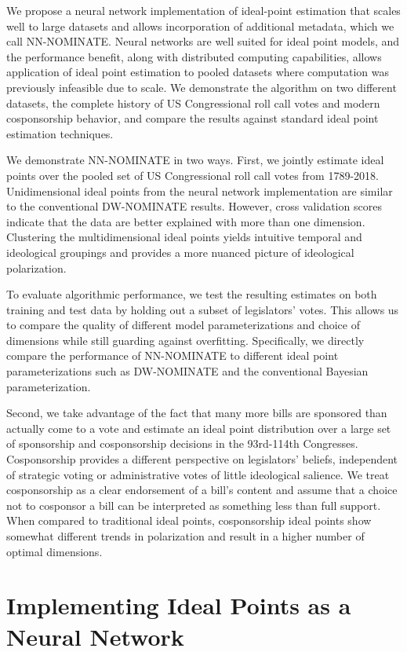 \documentclass[11pt,]{article}
\begin{document}
We propose a neural network implementation of ideal-point estimation
that scales well to large datasets and allows incorporation of
additional metadata, which we call NN-NOMINATE. Neural networks are well
suited for ideal point models, and the performance benefit, along with
distributed computing capabilities, allows application of ideal point
estimation to pooled datasets where computation was previously
infeasible due to scale. We demonstrate the algorithm on two different
datasets, the complete history of US Congressional roll call votes and
modern cosponsorship behavior, and compare the results against standard
ideal point estimation techniques.

We demonstrate NN-NOMINATE in two ways. First, we jointly estimate ideal
points over the pooled set of US Congressional roll call votes from
1789-2018. Unidimensional ideal points from the neural network
implementation are similar to the conventional DW-NOMINATE results.
However, cross validation scores indicate that the data are better
explained with more than one dimension. Clustering the multidimensional
ideal points yields intuitive temporal and ideological groupings and
provides a more nuanced picture of ideological polarization.

To evaluate algorithmic performance, we test the resulting estimates on
both training and test data by holding out a subset of legislators'
votes. This allows us to compare the quality of different model
parameterizations and choice of dimensions while still guarding against
overfitting. Specifically, we directly compare the performance of
NN-NOMINATE to different ideal point parameterizations such as
DW-NOMINATE and the conventional Bayesian parameterization.

Second, we take advantage of the fact that many more bills are sponsored
than actually come to a vote and estimate an ideal point distribution
over a large set of sponsorship and cosponsorship decisions in the
93rd-114th Congresses. Cosponsorship provides a different perspective on
legislators' beliefs, independent of strategic voting or administrative
votes of little ideological salience. We treat cosponsorship as a clear
endorsement of a bill's content and assume that a choice not to
cosponsor a bill can be interpreted as something less than full support.
When compared to traditional ideal points, cosponsorship ideal points
show somewhat different trends in polarization and result in a higher
number of optimal dimensions.

\section{Implementing Ideal Points as a Neural
Network}\label{implementing-ideal-points-as-a-neural-network}
\end{document}
